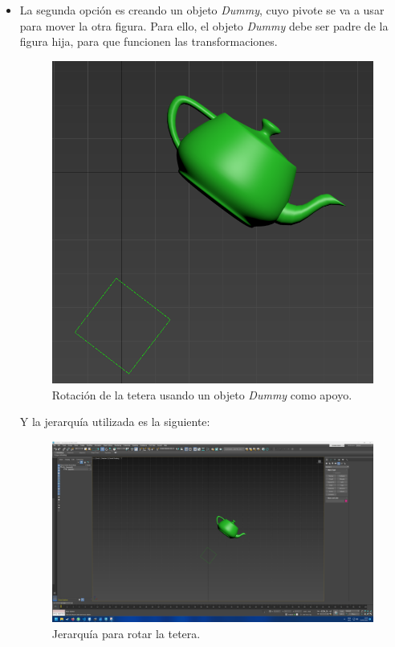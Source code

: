 \documentclass{article}
\begin{document}
\begin{itemize}
    \item La segunda opción es creando un objeto \textit{Dummy}, cuyo pivote se va a usar para mover la otra figura. Para ello, el objeto \textit{Dummy} debe ser padre de la figura hija, para que funcionen las transformaciones.
    \begin{figure}[H]
        \centering
        \includegraphics[width=\textwidth]{imagenes/tetedummy.png}
        \caption{Rotación de la tetera usando un objeto \textit{Dummy} como apoyo.}
     \end{figure}    

     Y la jerarquía utilizada es la siguiente:

     \begin{figure}[H]
        \centering
        \includegraphics[width=\textwidth]{imagenes/tetejer.png}
        \caption{Jerarquía para rotar la tetera.}
     \end{figure}         
\end{itemize}
\end{document}
